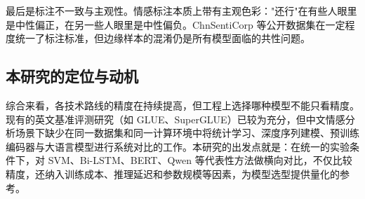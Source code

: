 最后是标注不一致与主观性。情感标注本质上带有主观色彩："还行"在有些人眼里是中性偏正，在另一些人眼里是中性偏负。ChnSentiCorp 等公开数据集在一定程度统一了标注标准，但边缘样本的混淆仍是所有模型面临的共性问题。

\subsection{本研究的定位与动机}

综合来看，各技术路线的精度在持续提高，但工程上选择哪种模型不能只看精度。现有的英文基准评测研究（如 GLUE、SuperGLUE）已较为充分，但中文情感分析场景下缺少在同一数据集和同一计算环境中将统计学习、深度序列建模、预训练编码器与大语言模型进行系统对比的工作。本研究的出发点就是：在统一的实验条件下，对 SVM、Bi-LSTM、BERT、Qwen 等代表性方法做横向对比，不仅比较精度，还纳入训练成本、推理延迟和参数规模等因素，为模型选型提供量化的参考。
